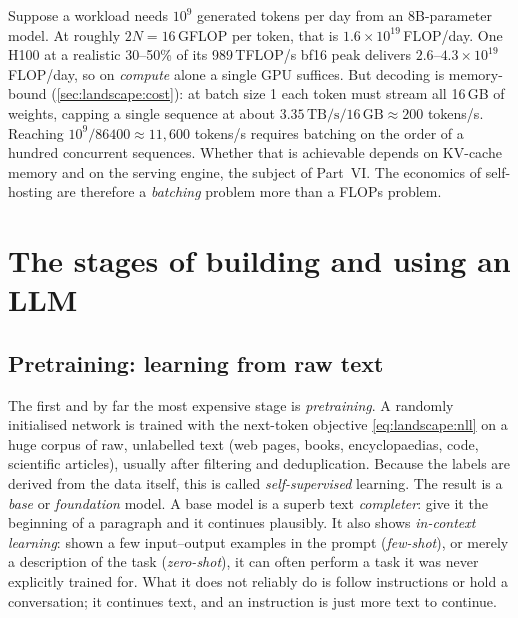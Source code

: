 \begin{napkinmath}
Suppose a workload needs $10^9$ generated tokens per day from an 8B-parameter model. At roughly
$2N = 16$\,GFLOP per token, that is $1.6\times10^{19}$\,FLOP/day. One H100 at a realistic 30--50\% of
its 989\,TFLOP/s bf16 peak delivers $2.6$--$4.3\times10^{19}$\,FLOP/day, so on \emph{compute} alone a single
GPU suffices. But decoding is memory-bound (\cref{sec:landscape:cost}): at batch size 1 each token
must stream all 16\,GB of weights, capping a single sequence at about $3.35\,\text{TB/s} / 16\,\text{GB}
\approx 200$ tokens/s. Reaching $10^9/86400 \approx 11{,}600$ tokens/s requires batching on the order of
a hundred concurrent sequences. Whether that is achievable depends on KV-cache memory and on the
serving engine, the subject of Part~VI. The economics of self-hosting are therefore a
\emph{batching} problem more than a FLOPs problem.
\end{napkinmath}

\section{The stages of building and using an LLM}\label{sec:landscape:stages}

\subsection{Pretraining: learning from raw text}
The first and by far the most expensive stage is \emph{pretraining}. A randomly initialised network is
trained with the next-token objective \eqref{eq:landscape:nll} on a huge corpus of raw, unlabelled text
(web pages, books, encyclopaedias, code, scientific articles), usually after filtering and
deduplication. Because the labels are derived from the data itself, this is called
\emph{self-supervised} learning. The result is a \emph{base} or \emph{foundation} model. A base model
is a superb text \emph{completer}: give it the beginning of a paragraph and it continues plausibly. It
also shows \emph{in-context learning}: shown a few input--output examples in the prompt
(\emph{few-shot}), or merely a description of the task (\emph{zero-shot}), it can often perform a task it
was never explicitly trained for. What it does not reliably do is follow instructions or hold a
conversation; it continues text, and an instruction is just more text to continue.

